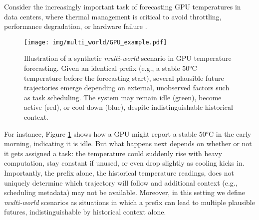 \documentclass[a4paper,oneside,bibliography=totoc]{scrbook}
\begin{document}
Consider the increasingly important task of forecasting GPU temperatures in data centers, where
thermal management is critical to avoid throttling, performance degradation, or hardware failure \cite{cao_gpu_2017, zhao_sustainable_2023}.
\begin{figure}[h]
    \centering
    \texttt{[image: img/multi\_world/GPU\_example.pdf]}
    \caption{Illustration of a synthetic \textit{multi-world} scenario in GPU temperature forecasting. Given an identical prefix (e.g., a stable 50°C temperature before the forecasting start), several plausible future trajectories emerge depending on external, unobserved factors such as task scheduling. The system may remain idle (green), become active (red), or cool down (blue), despite indistinguishable historical context.}
    \label{fig:gpu_example}
\end{figure}
For instance, Figure \ref{fig:gpu_example} shows how a GPU might report a stable 50°C in the early morning, indicating it is idle.
But what happens next depends on whether or not it gets assigned a task: the temperature could suddenly rise with heavy computation, stay constant if unused, or even drop slightly as cooling kicks in. 
Importantly, the prefix alone, the historical temperature readings, does not uniquely determine which trajectory will follow and additional context (e.g., scheduling metadata) may not be available.
Moreover, in this setting we define \textit{multi-world} scenarios as situations in which a
prefix can lead to multiple plausible futures, indistinguishable by historical context alone.
\end{document}
